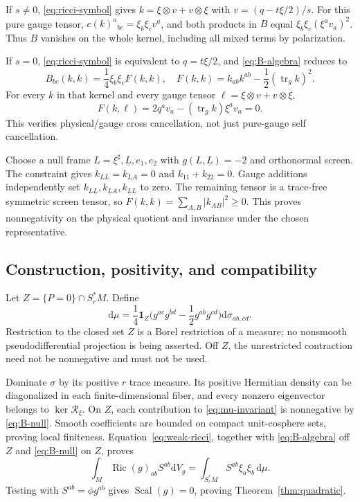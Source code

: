 \documentclass[11pt,a4paper]{article}
\numberwithin{equation}{section}
\newcommand{\Ric}{\operatorname{Ric}}
\newcommand{\Scal}{\operatorname{Scal}}
\newcommand{\tr}{\operatorname{tr}}
\newcommand{\dd}{\mathrm d}
\newcommand{\dV}{\dd V_g}
\newcommand{\f}[2]{\frac{#1}{#2}}
\theoremstyle{definition}
\begin{document}
If $s\ne0$, \eqref{eq:ricci-symbol} gives $k=\xi\otimes v+v\otimes\xi$ with $v=(q-t\xi/2)/s$. For this pure gauge tensor, $c(k)^a{}_{bc}=\xi_b\xi_cv^a$, and both products in $B$ equal $\xi_b\xi_c(\xi^av_a)^2$. Thus $B$ vanishes on the whole kernel, including all mixed terms by polarization.

If $s=0$, \eqref{eq:ricci-symbol} is equivalent to $q=t\xi/2$, and \eqref{eq:B-algebra} reduces to
\begin{equation}\label{eq:B-null}
B_{bc}(k,k)=\f14\xi_b\xi_c F(k,k),\quad
F(k,k)=k_{ab}k^{ab}-\f12(\tr_gk)^2.
\end{equation}
For every $k$ in that kernel and every gauge tensor $\ell=\xi\otimes v+v\otimes\xi$,
\begin{equation*}
F(k,\ell)=2q^av_a-(\tr_gk)\xi^av_a=0.
\end{equation*}
This verifies physical/gauge cross cancellation, not just pure-gauge self cancellation.

Choose a null frame $L=\xi^\sharp,\underline L,e_1,e_2$ with $g(L,\underline L)=-2$ and orthonormal screen. The constraint gives $k_{LL}=k_{LA}=0$ and $k_{11}+k_{22}=0$. Gauge additions independently set $k_{L\underline L},k_{\underline LA},k_{\underline L\underline L}$ to zero. The remaining tensor is a trace-free symmetric screen tensor, so $F(k,k)=\sum_{A,B}|k_{AB}|^2\geq0$. This proves nonnegativity on the physical quotient and invariance under the chosen representative.

\subsection{Construction, positivity, and compatibility}

Let $Z=\{P=0\}\cap S_r^*M$. Define
\begin{equation}\label{eq:mu-invariant}
\dd\mu=\f14\mathbf1_Z\bigl(g^{ac}g^{bd}-\f12g^{ab}g^{cd}\bigr)\dd\sigma_{ab,cd}.
\end{equation}
Restriction to the closed set $Z$ is a Borel restriction of a measure; no nonsmooth pseudodifferential projection is being asserted. Off $Z$, the unrestricted contraction need not be nonnegative and must not be used.

Dominate $\sigma$ by its positive $r$ trace measure. Its positive Hermitian density can be diagonalized in each finite-dimensional fiber, and every nonzero eigenvector belongs to $\ker\mathcal R_\xi$. On $Z$, each contribution to \eqref{eq:mu-invariant} is nonnegative by \eqref{eq:B-null}. Smooth coefficients are bounded on compact unit-cosphere sets, proving local finiteness. Equation~\eqref{eq:weak-ricci}, together with \eqref{eq:B-algebra} off $Z$ and \eqref{eq:B-null} on $Z$, proves
\begin{equation*}
\int_M\Ric(g)_{ab}S^{ab}\dV=\int_{S_r^*M}S^{ab}\xi_a\xi_b\,\dd\mu.
\end{equation*}
Testing with $S^{ab}=\phi g^{ab}$ gives $\Scal(g)=0$, proving Theorem~\ref{thm:quadratic}.
\end{document}

